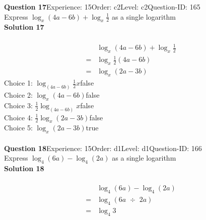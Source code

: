 \documentclass{article}
\begin{document}
\noindent\textbf{Question 17}\hspace{20pt}Experience: 15\hspace{20pt}Order: c2\hspace{20pt}Level: c2\hspace{20pt}Question-ID: 165\\[2pt]
Express $\log_{x}(4a-6b)+\log_{x}\displaystyle\frac{1}{2}$ as a single logarithm\\[4pt]
\noindent\textbf{Solution 17}\\[2pt]
\\[-35pt]\begin{align*}
&\log_{x}(4a-6b)+\log_{x}\displaystyle\frac{1}{2}\\[2pt]
=&\log_{x}\displaystyle\frac{1}{2}(4a-6b)\\[2pt]
=&\log_{x}(2a-3b)
\end{align*}
Choice 1: \hspace{20pt}$\log_{(4a-6b)}\displaystyle\frac{1}{2}x$\hspace{20pt}false\\
Choice 2: \hspace{20pt}$\log_{x}(4a-6b)$\hspace{20pt}false\\
Choice 3: \hspace{20pt}$\displaystyle\frac{1}{2}\log_{(4a-6b)}x$\hspace{20pt}false\\
Choice 4: \hspace{20pt}$\displaystyle\frac{1}{2}\log_{x}(2a-3b)$\hspace{20pt}false\\
Choice 5: \hspace{20pt}$\log_{x}(2a-3b)$\hspace{20pt}true\\
\\[4pt]
\noindent\textbf{Question 18}\hspace{20pt}Experience: 15\hspace{20pt}Order: d1\hspace{20pt}Level: d1\hspace{20pt}Question-ID: 166\\[2pt]
Express $\log_{4}(6a)-\log_{4}(2a)$ as a single logarithm\\[4pt]
\noindent\textbf{Solution 18}\\[2pt]
\\[-35pt]\begin{align*}
&\log_{4}(6a)-\log_{4}(2a)\\[2pt]
=&\log_{4}(6a \,\, \div \,\, 2a)\\[2pt]
=&\log_{4}3
\end{align*}
\end{document}
